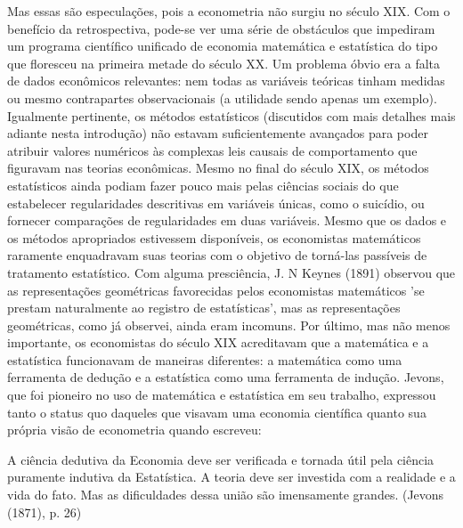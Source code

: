 \documentclass[12pt]{article}
\begin{document}
Mas essas são especulações, pois a econometria não surgiu no século XIX. Com o benefício da retrospectiva, pode-se ver uma série de obstáculos que impediram um programa científico unificado de economia matemática e estatística do tipo que floresceu na primeira metade do século XX. Um problema óbvio era a falta de dados econômicos relevantes: nem todas as variáveis teóricas tinham medidas ou mesmo contrapartes observacionais (a utilidade sendo apenas um exemplo). Igualmente pertinente, os métodos estatísticos (discutidos com mais detalhes mais adiante nesta introdução) não estavam suficientemente avançados para poder atribuir valores numéricos às complexas leis causais de comportamento que figuravam nas teorias econômicas. Mesmo no final do século XIX, os métodos estatísticos ainda podiam fazer pouco mais pelas ciências sociais do que estabelecer regularidades descritivas em variáveis únicas, como o suicídio, ou fornecer comparações de regularidades em duas variáveis. Mesmo que os dados e os métodos apropriados estivessem disponíveis, os economistas matemáticos raramente enquadravam suas teorias com o objetivo de torná-las passíveis de tratamento estatístico. Com alguma presciência, J. N Keynes (1891) observou que as representações geométricas favorecidas pelos economistas matemáticos 'se prestam naturalmente ao registro de estatísticas', mas as representações geométricas, como já observei, ainda eram incomuns. Por último, mas não menos importante, os economistas do século XIX acreditavam que a matemática e a estatística funcionavam de maneiras diferentes: a matemática como uma ferramenta de dedução e a estatística como uma ferramenta de indução. Jevons, que foi pioneiro no uso de matemática e estatística em seu trabalho, expressou tanto o status quo daqueles que visavam uma economia científica quanto sua própria visão de econometria quando escreveu:

A ciência dedutiva da Economia deve ser verificada e tornada útil pela ciência puramente indutiva da Estatística. A teoria deve ser investida com a realidade e a vida do fato. Mas as dificuldades dessa união são imensamente grandes. (Jevons (1871), p. 26)
\end{document}
